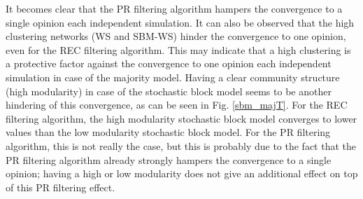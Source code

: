 \documentclass[11 pt , letterpaper , twoside , openright]{book}
\begin{document}
\newline
It becomes clear that the PR filtering algorithm hampers the convergence to a single opinion each independent simulation. It can also be observed that the high clustering networks (WS and SBM-WS) hinder the convergence to one opinion, even for the REC filtering algorithm. This may indicate that a high clustering is a protective factor against the convergence to one opinion each independent simulation in case of the majority model. Having a clear community structure (high modularity) in case of the stochastic block model seems to be another hindering of this convergence, as can be seen in Fig. \ref{sbm_majT}.  For the REC filtering algorithm, the high modularity stochastic block model converges to lower values than the low modularity stochastic block model. For the PR filtering algorithm, this is not really the case, but this is probably due to the fact that the PR filtering algorithm already strongly hampers the convergence to a single opinion; having a high or low modularity does not give an additional effect on top of this PR filtering effect.
\end{document}
